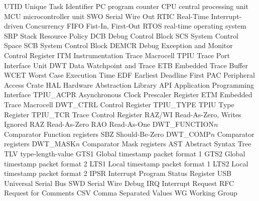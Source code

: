  {UTID} {{Unique Task Identifier}}
 {PC} {{program counter}}
 {CPU} {{central processing unit}}
 {MCU} {{microcontroller unit}}
 {SWO} {{Serial Wire Out}}
 {RTIC} {Real-Time Interrupt-driven Concurrency}
 {FIFO} {{Fist-In, First-Out}}
 {RTOS} {{real-time operating system}}
 {SRP} {{Stack Resource Policy}}
 {DCB} {{Debug Control Block}}
 {SCS} {{System Control Space}}
 {SCB} {{System Control Block}}
 {DEMCR} {{Debug Exception and Monitor Control Register}}
 {ITM} {{Instrumentation Trace Macrocell}}
 {TPIU} {{Trace Port Interface Unit}}
 {DWT} {{Data Watchpoint and Trace}}
 {ETB} {{Embedded Trace Buffer}}
 {WCET} {{Worst Case Execution Time}}
 {EDF} {{Earliest Deadline First}}
 {PAC} {{Peripheral Access Crate}}
 {HAL} {{Hardware Abstraction Library}}
 {API} {{Application Programming Interface}}
 {TPIU\_ACPR} {{Asynchronous Clock Prescaler Register}}
 {ETM} {{Embedded Trace Macrocell}}
 {DWT\_CTRL} {{Control Register}}
 {TPIU\_TYPE} {{TPIU Type Register}}
 {TPIU\_TCR} {{Trace Control Register}}
 {RAZ/WI} {{Read-As-Zero, Writes Ignored}}
 {RAZ} {{Read-As-Zero}}
 {RAO} {{Read-As-One}}
 {DWT\_FUNCTION$n$} {{Comparator Function registers}}
 {SBZ} {{Should-Be-Zero}}
 {DWT\_COMP$n$} {{Comparator registers}}
 {DWT\_MASK$n$} {{Comparator Mask registers}}
 {AST} {{Abstract Syntax Tree}}
 {TLV} {{type-length-value}}
 {GTS1} {{Global timestamp packet format 1}}
 {GTS2} {{Global timestamp packet format 2}}
 {LTS1} {{Local timestamp packet format 1}}
 {LTS2} {{Local timestamp packet format 2}}
 {IPSR} {{Interrupt Program Status Register}}
 {USB} {{Universal Serial Bus}}
 {SWD} {{Serial Wire Debug}}
 {IRQ} {{Interrupt Request}}
 {RFC} {{Request for Comments}}
 {CSV} {{Comma Separated Values}}
 {WG} {{Working Group}}
